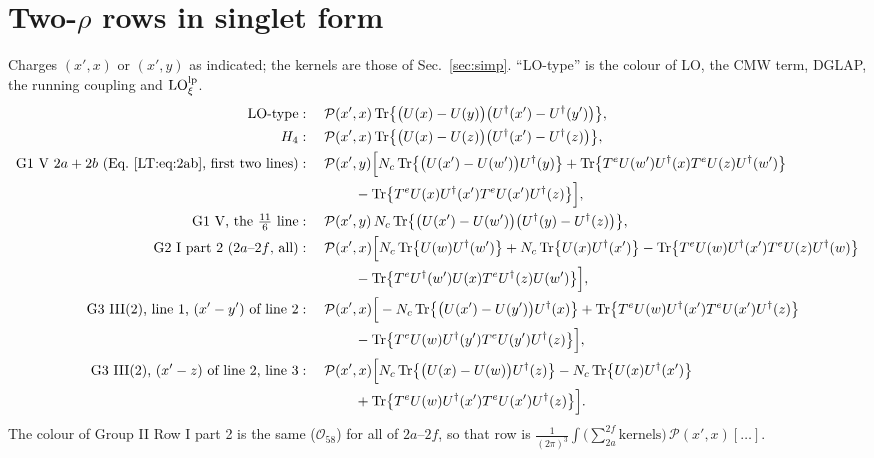 \documentclass[10pt]{article}
\numberwithin{equation}{section}
\newcommand{\LO}{{\rm LO}}
\newcommand{\PP}{\mathcal P}
\newcommand{\Tr}{{\rm Tr}}
\newcommand{\Ud}{U^\dagger}
\newcommand{\OO}{\mathcal O}
\begin{document}
\section{Two-\texorpdfstring{$\rho$}{rho} rows in singlet form}\label{GS:sec:two}
Charges $(x',x)$ or $(x',y)$ as indicated; the kernels are those of Sec.~\ref{sec:simp}. ``LO-type'' is the colour of LO, the CMW term, DGLAP, the running coupling and $\LO^{\rm lp}_\xi$.
\begin{align}
\text{LO-type}&:\quad\PP(x',x)\,\Tr\big\{\big(U(x)-U(y)\big)\big(\Ud(x')-\Ud(y')\big)\big\},\label{GS:eq:LO}\\
H_4&:\quad\PP(x',x)\,\Tr\big\{\big(U(x)-U(z)\big)\big(\Ud(x')-\Ud(z)\big)\big\},\\
\text{G1 V } 2a+2b\text{ (Eq.~\eqref{LT:eq:2ab}, first two lines)}&:\quad\PP(x',y)\Big[N_c\,\Tr\big\{\big(U(x')-U(w')\big)\Ud(y)\big\}+\Tr\big\{T^eU(w')\Ud(x)T^eU(z)\Ud(w')\big\}\notag\\
&\qquad\qquad-\Tr\big\{T^eU(x)\Ud(x')T^eU(x')\Ud(z)\big\}\Big],\\
\text{G1 V, the }\tfrac{11}{6}\text{ line}&:\quad\PP(x',y)\,N_c\,\Tr\big\{\big(U(x')-U(w')\big)\big(\Ud(y)-\Ud(z)\big)\big\},\\
\text{G2 I part 2 ($2a$--$2f$, all)}&:\quad\PP(x',x)\Big[N_c\,\Tr\big\{U(w)\Ud(w')\big\}+N_c\,\Tr\big\{U(x)\Ud(x')\big\}-\Tr\big\{T^eU(w)\Ud(x')T^eU(z)\Ud(w)\big\}\notag\\
&\qquad\qquad-\Tr\big\{T^e\Ud(w')U(x)T^e\Ud(z)U(w')\big\}\Big],\\
\text{G3 III(2), line 1, }(x'-y')\text{ of line 2}&:\quad\PP(x',x)\Big[-N_c\,\Tr\big\{\big(U(x')-U(y')\big)\Ud(x)\big\}+\Tr\big\{T^eU(w)\Ud(x')T^eU(x')\Ud(z)\big\}\notag\\
&\qquad\qquad-\Tr\big\{T^eU(w)\Ud(y')T^eU(y')\Ud(z)\big\}\Big],\\
\text{G3 III(2), }(x'-z)\text{ of line 2, line 3}&:\quad\PP(x',x)\Big[N_c\,\Tr\big\{\big(U(x)-U(w)\big)\Ud(z)\big\}-N_c\,\Tr\big\{U(x)\Ud(x')\big\}\notag\\
&\qquad\qquad+\Tr\big\{T^eU(w)\Ud(x')T^eU(x')\Ud(z)\big\}\Big].
\end{align}
The colour of Group II Row I part 2 is the same ($\OO_{58}$) for all of $2a$--$2f$, so that row is $\frac{1}{(2\pi)^3}\int\big(\sum_{2a}^{2f}\text{kernels}\big)\,\PP(x',x)[\dots]$.
\end{document}

